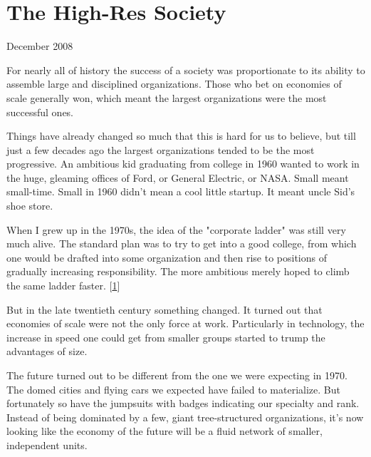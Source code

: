 \chapter{The High-Res Society}


            
              
                

December 2008

For nearly all of history the
                  success of a society was proportionate to its ability to
                  assemble large and disciplined organizations. Those who bet on
                  economies of scale generally won, which meant the largest
                  organizations were the most successful ones.

Things
                  have already changed so much that this is hard for us to
                  believe, but till just a few decades ago the largest
                  organizations tended to be the most progressive. An ambitious
                  kid graduating from college in 1960 wanted to work in the
                  huge, gleaming offices of Ford, or General Electric, or NASA.
                  Small meant small-time. Small in 1960 didn't mean a cool
                  little startup. It meant uncle Sid's shoe store.

When
                  I grew up in the 1970s, the idea of the "corporate ladder" was
                  still very much alive. The standard plan was to try to get
                  into a good college, from which one would be drafted into some
                  organization and then rise to positions of gradually
                  increasing responsibility. The more ambitious merely hoped to
                  climb the same ladder faster.
                  [\href{\#f1n}{1}]

But in the late twentieth century something
                  changed. It turned out that economies of scale were not the
                  only force at work. Particularly in technology, the increase
                  in speed one could get from smaller groups started to trump
                  the advantages of size.

The future turned out to be
                  different from the one we were expecting in 1970. The domed
                  cities and flying cars we expected have failed to materialize.
                  But fortunately so have the jumpsuits with badges indicating
                  our specialty and rank. Instead of being dominated by a few,
                  giant tree-structured organizations, it's now looking like the
                  economy of the future will be a fluid network of smaller,
                  independent units.

